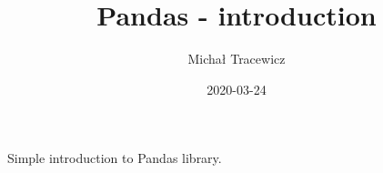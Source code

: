 \documentclass{article}
\title{Pandas - introduction}
\date{2020-03-24}
\author{Micha\l{} Tracewicz}
\begin{document}
\maketitle
\newpage
Simple introduction to Pandas library.
\end{document}
